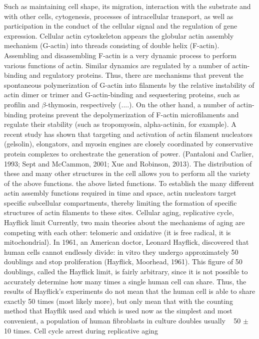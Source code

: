 \documentclass[a4paper,12pt]{article}
\begin{document}
Such as maintaining cell shape, its migration, interaction with the substrate and with other cells, cytogenesis, processes of intracellular transport, as well as participation in the conduct of the cellular signal and the regulation of gene expression.
Cellular actin cytoskeleton appears
the globular actin assembly mechanism (G-actin) into threads consisting of double helix (F-actin).
Assembling and disassembling F-actin is a very dynamic process to perform various functions of actin. Similar dynamics are regulated by a number of actin-binding and regulatory proteins.
Thus, there are mechanisms that prevent the spontaneous polymerization of G-actin into filaments by the relative instability of actin dimer or trimer and G-actin-binding and sequestering proteins, such as profilin and $\beta$-thymosin, respectively (....).
On the other hand, a number of actin-binding proteins prevent the depolymerization of F-actin microfilaments and regulate their stability (such as tropomyosin, alpha-actinin, for example). A recent study has shown that targeting and activation of actin filament nucleators (gelsolin), elongators, and myosin engines are closely coordinated by conservative protein complexes to orchestrate the generation of power. (Pantaloni and Carlier, 1993; Sept and McCammon, 2001; Xue and Robinson, 2013). The distribution of these and many other structures in the cell allows you to perform all the variety of the above functions.
the above listed functions.
To establish the many different actin assembly functions required in time and space, actin nucleators target specific subcellular compartments, thereby limiting the formation of specific structures of actin filaments to these sites.
Cellular aging, replicative cycle, Hayflick limit
Currently, two main theories about the mechanisms of aging are competing with each other: telomeric and oxidative (it is free radical, it is mitochondrial). In 1961, an American doctor, Leonard Hayflick, discovered that human cells cannot endlessly divide: in vitro they undergo approximately 50 doublings and stop proliferation (Hayflick, Moorhead, 1961). This figure of 50 doublings, called the Hayflick limit, is fairly arbitrary, since it is not possible to accurately determine how many times a single human cell can share. Thus, the results of Hayflick's experiments do not mean that the human cell is able to share exactly 50 times (most likely more), but only mean that with the counting method that Hayflik used and which is used now as the simplest and most convenient, a population of human fibroblasts in culture doubles usually ~ 50 $\pm$ 10 times.
Cell cycle arrest during replicative aging
\end{document}
